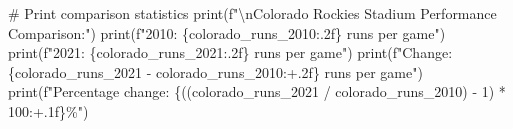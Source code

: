 \documentclass[
  letterpaper,
  DIV=11,
  numbers=noendperiod]{scrartcl}
\newenvironment{Shaded}{\begin{snugshade}}{\end{snugshade}}
\newcommand{\BuiltInTok}[1]{\textcolor[rgb]{0.00,0.23,0.31}{#1}}
\newcommand{\CharTok}[1]{\textcolor[rgb]{0.13,0.47,0.30}{#1}}
\newcommand{\CommentTok}[1]{\textcolor[rgb]{0.37,0.37,0.37}{#1}}
\newcommand{\DecValTok}[1]{\textcolor[rgb]{0.68,0.00,0.00}{#1}}
\newcommand{\NormalTok}[1]{\textcolor[rgb]{0.00,0.23,0.31}{#1}}
\newcommand{\OperatorTok}[1]{\textcolor[rgb]{0.37,0.37,0.37}{#1}}
\newcommand{\SpecialCharTok}[1]{\textcolor[rgb]{0.37,0.37,0.37}{#1}}
\newcommand{\SpecialStringTok}[1]{\textcolor[rgb]{0.13,0.47,0.30}{#1}}
\begin{document}
\begin{tcolorbox}
\begin{Shaded}
\begin{Highlighting}[]
\CommentTok{\# Print comparison statistics}
\BuiltInTok{print}\NormalTok{(}\SpecialStringTok{f"}\CharTok{\textbackslash{}n}\SpecialStringTok{Colorado Rockies Stadium Performance Comparison:"}\NormalTok{)}
\BuiltInTok{print}\NormalTok{(}\SpecialStringTok{f"2010: }\SpecialCharTok{\{}\NormalTok{colorado\_runs\_2010}\SpecialCharTok{:.2f\}}\SpecialStringTok{ runs per game"}\NormalTok{)}
\BuiltInTok{print}\NormalTok{(}\SpecialStringTok{f"2021: }\SpecialCharTok{\{}\NormalTok{colorado\_runs\_2021}\SpecialCharTok{:.2f\}}\SpecialStringTok{ runs per game"}\NormalTok{)}
\BuiltInTok{print}\NormalTok{(}\SpecialStringTok{f"Change: }\SpecialCharTok{\{}\NormalTok{colorado\_runs\_2021 }\OperatorTok{{-}}\NormalTok{ colorado\_runs\_2010}\SpecialCharTok{:+.2f\}}\SpecialStringTok{ runs per game"}\NormalTok{)}
\BuiltInTok{print}\NormalTok{(}\SpecialStringTok{f"Percentage change: }\SpecialCharTok{\{}\NormalTok{((colorado\_runs\_2021 }\OperatorTok{/}\NormalTok{ colorado\_runs\_2010) }\OperatorTok{{-}} \DecValTok{1}\NormalTok{) }\OperatorTok{*} \DecValTok{100}\SpecialCharTok{:+.1f\}}\SpecialStringTok{\%"}\NormalTok{)}


\end{Highlighting}
\end{Shaded}
\end{tcolorbox}
\end{document}
